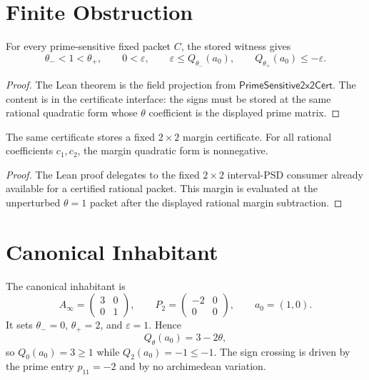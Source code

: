 \section{Finite Obstruction}
\label{sec:rh-weil-prime-sensitive-finite-obstruction}

\begin{theorem}
\label{thm:rh-weil-prime-sensitive-sign-crossing}
For every prime-sensitive fixed packet $C$, the stored witness gives
$$
\theta_-<1<\theta_+,
\qquad
0<\varepsilon,
\qquad
\varepsilon\le Q_{\theta_-}(a_0),
\qquad
Q_{\theta_+}(a_0)\le -\varepsilon .
$$
\end{theorem}

\begin{proof}
The Lean theorem is the field projection from
$\mathsf{PrimeSensitive2x2Cert}$. The content is in the certificate
interface: the signs must be stored at the same rational quadratic form
whose $\theta$ coefficient is the displayed prime matrix.
\end{proof}

\begin{theorem}
\label{thm:rh-weil-prime-sensitive-margin}
The same certificate stores a fixed $2\times2$ margin certificate. For all
rational coefficients $c_1,c_2$, the margin quadratic form is nonnegative.
\end{theorem}

\begin{proof}
The Lean proof delegates to the fixed $2\times2$ interval-PSD consumer
already available for a certified rational packet. This margin is evaluated
at the unperturbed $\theta=1$ packet after the displayed rational margin
subtraction.
\end{proof}

\section{Canonical Inhabitant}
\label{sec:rh-weil-prime-sensitive-canonical}

\begin{definition}
\label{def:rh-weil-prime-sensitive-canonical}
The canonical inhabitant is
$$
A_{\infty}=
\begin{pmatrix}
3&0\\
0&1
\end{pmatrix},
\qquad
P_2=
\begin{pmatrix}
-2&0\\
0&0
\end{pmatrix},
\qquad
a_0=(1,0).
$$
It sets $\theta_-=0$, $\theta_+=2$, and $\varepsilon=1$. Hence
$$
Q_{\theta}(a_0)=3-2\theta,
$$
so $Q_0(a_0)=3\ge1$ while $Q_2(a_0)=-1\le-1$. The sign crossing is driven
by the prime entry $p_{11}=-2$ and by no archimedean variation.
\end{definition}

